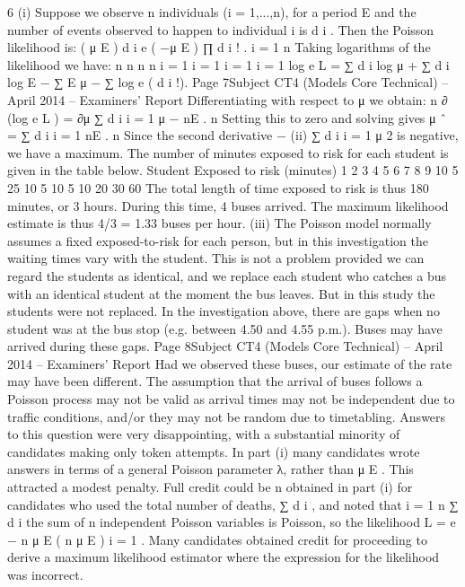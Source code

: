 \documentclass[a4paper,12pt]{article}
\begin{document}
\begin{enumerate}
6
(i)
Suppose we observe n individuals (i = 1,...,n), for a period E and the number
of events observed to happen to individual i is d i .
Then the Poisson likelihood is:
( μ E ) d i e ( −μ E )
∏ d i ! .
i = 1
n
Taking logarithms of the likelihood we have:
n n n n
i = 1 i = 1 i = 1 i = 1
log e L = ∑ d i log μ + ∑ d i log E − ∑ E μ − ∑ log e ( d i !).
Page 7Subject CT4 (Models Core Technical) – April 2014 – Examiners’ Report
Differentiating with respect to μ we obtain:
n
∂ (log e L )
=
∂μ
∑ d i
i = 1
μ
− nE .
n
Setting this to zero and solving gives μ ˆ =
∑ d i
i = 1
nE
.
n
Since the second derivative −
(ii)
∑ d i
i = 1
μ 2
is negative, we have a maximum.
The number of minutes exposed to risk for each student is given in the table
below.
Student Exposed to risk (minutes)
1
2
3
4
5
6
7
8
9
10 5
25
10
5
10
5
10
20
30
60
The total length of time exposed to risk is thus 180 minutes, or 3 hours.
During this time, 4 buses arrived.
The maximum likelihood estimate is thus 4/3 = 1.33 buses per hour.
(iii)
The Poisson model normally assumes a fixed exposed-to-risk for each person,
but in this investigation the waiting times vary with the student.
This is not a problem provided we can regard the students as identical, and we
replace each student who catches a bus with an identical student at the moment
the bus leaves.
But in this study the students were not replaced.
In the investigation above, there are gaps when no student was at the bus stop
(e.g. between 4.50 and 4.55 p.m.). Buses may have arrived during these gaps.
Page 8Subject CT4 (Models Core Technical) – April 2014 – Examiners’ Report
Had we observed these buses, our estimate of the rate may have been different.
The assumption that the arrival of buses follows a Poisson process may not be
valid as arrival times may not be independent due to traffic conditions, and/or
they may not be random due to timetabling.
Answers to this question were very disappointing, with a substantial minority of candidates
making only token attempts. In part (i) many candidates wrote answers in terms of a general
Poisson parameter λ, rather than μ E . This attracted a modest penalty. Full credit could be
n
obtained in part (i) for candidates who used the total number of deaths, ∑ d i , and noted that
i = 1
n
∑ d i
the sum of n independent Poisson variables is Poisson, so the likelihood L = e − n μ E ( n μ E ) i = 1 .
Many candidates obtained credit for proceeding to derive a maximum likelihood estimator
where the expression for the likelihood was incorrect.

\end{enumerate}
\end{document}
